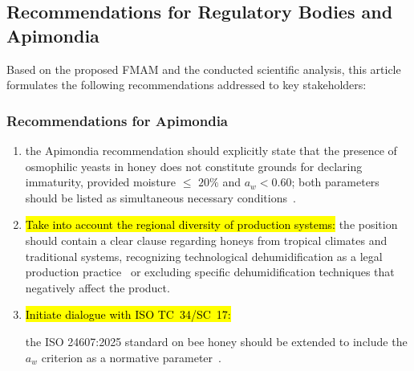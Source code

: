 \documentclass[foods,review,accept,pdftex,moreauthors]{Definitions/mdpi}
\begin{document}
{\subsection{Recommendations for Regulatory Bodies and Apimondia}



Based on the proposed FMAM and the conducted scientific analysis,
this article formulates the following recommendations addressed
to key stakeholders:


\subsubsection{Recommendations for Apimondia}

\begin{enumerate}
    \item {} the Apimondia recommendation should
          explicitly state that the presence of osmophilic yeasts
          in honey does not constitute grounds for declaring
          immaturity, provided moisture $\leq$ $20\%$ and
          $a_w < 0.60$; both parameters should be listed as
          simultaneous necessary
          conditions~\cite{ruegg1981,waaw2006}.
    \item {\hl{Take into account the regional diversity of
          production systems:}} the position should contain a clear
          clause regarding honeys from tropical climates and
          traditional systems, recognizing technological
          dehumidification as a legal production practice~\cite{tadele2025}
          or excluding specific dehumidification techniques
          that negatively affect the product.
    \item {\hl{Initiate dialogue with ISO TC~34/SC~17:}} %
    
          the ISO 24607:2025 standard on bee honey should be
          extended to include the $a_w$ criterion as a normative
          parameter~\cite{codex_stan12}.
\end{enumerate}

}
\end{document}
